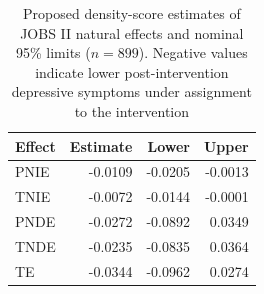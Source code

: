 \begin{table}[t]
\centering
\caption{Proposed density-score estimates of JOBS II natural effects and nominal 95\% limits ($n=899$). Negative values indicate lower post-intervention depressive symptoms under assignment to the intervention}
\label{tab:application_effects}
\small
\begin{tabular}{lrrr}
\toprule
Effect & Estimate & Lower & Upper \\
\midrule
PNIE & -0.0109 & -0.0205 & -0.0013 \\
TNIE & -0.0072 & -0.0144 & -0.0001 \\
PNDE & -0.0272 & -0.0892 & 0.0349 \\
TNDE & -0.0235 & -0.0835 & 0.0364 \\
TE & -0.0344 & -0.0962 & 0.0274 \\
\bottomrule
\end{tabular}
\end{table}

